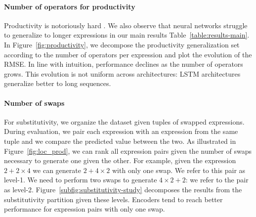 \paragraph{Number of operators for productivity} Productivity is notoriously hard \parencite{kim_20, hupkes_20, baroni_19}. We also observe that neural networks struggle to generalize to longer expressions in our main results Table~\ref{table:results-main}. In Figure~\ref{fig:productivity}, we decompose the productivity generalization set according to the number of operators per expression and plot the evolution of the RMSE. In line with intuition, performance declines as the number of operators grows. This evolution is not uniform across architectures: LSTM architectures generalize better to long sequences. 

\paragraph{Number of swaps} For substitutivity, we organize the dataset given tuples of swapped expressions. During evaluation, we pair each expression with an expression from the same tuple and we compare the predicted value between the two. As illustrated in Figure~\ref{fig:loc_prod}, we can rank all expression pairs given the number of swaps necessary to generate one given the other. For example, given the expression $2 + 2 \times 4$ we can generate $2 + 4 \times 2$ with only one swap. We refer to this pair as level-1. We need to perform two swaps to generate $4 \times 2 + 2$: we refer to the pair as level-2. Figure~\ref{subfig:substitutivity-study} decomposes the results from the substitutivity partition given these levels. Encoders tend to reach better performance for expression pairs with only one swap. 

